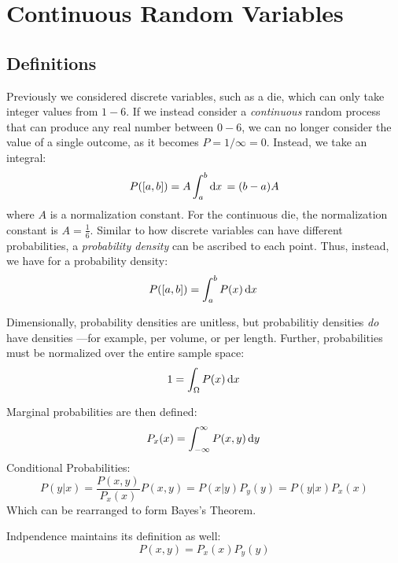 \chapter{Continuous Random Variables}
\section{Definitions}
Previously we considered discrete variables, such as a die, which can only take integer values from \(1-6\). If we instead consider a \emph{continuous} random process that can produce any real number between \(0-6\), we can no longer consider the value of a single outcome, as it becomes \(P=1/\infty=0\). Instead, we take an integral:
\[P([a,b])=A\int_a^b \d{x}=(b-a)A\]
where \(A\) is a normalization constant. For the continuous die, the normalization constant is \(A=\frac{1}{6}\). Similar to how discrete variables can have different probabilities, a \emph{probability density} can be ascribed to each point. Thus, instead, we have for a probability density:
\begin{equation}
	P([a,b])=\int_a^b P(x)\d{x} \label{eq3:probdens}
\end{equation}

Dimensionally, probability densities are unitless, but probabilitiy densities \emph{do} have densities ---for example, per volume, or per length. Further, probabilities must be normalized over the entire sample space:
\begin{equation}
	1=\int_\Omega P(x)\d{x}\label{eq3:normal}
\end{equation}

Marginal probabilities are then defined:
\begin{equation}
	P_x(x)=\int_{-\infty}^\infty P(x,y)\d{y}\label{eq3:margin}
\end{equation}
Conditional Probabilities:
\begin{subequations}
\begin{equation}
	P(y|x)=\frac{P(x,y)}{P_x(x)}\label{eq3:condproba}
\end{equation}
\begin{equation}
	P(x,y)=P(x|y)P_y(y)=P(y|x)P_x(x)\label{eq3:condprobb}
\end{equation}
\end{subequations}
Which can be rearranged to form Bayes's Theorem.

Indpendence maintains its definition as well:
\begin{equation}
	P(x,y)=P_x(x)P_y(y)\label{eq3:indep}
\end{equation}

